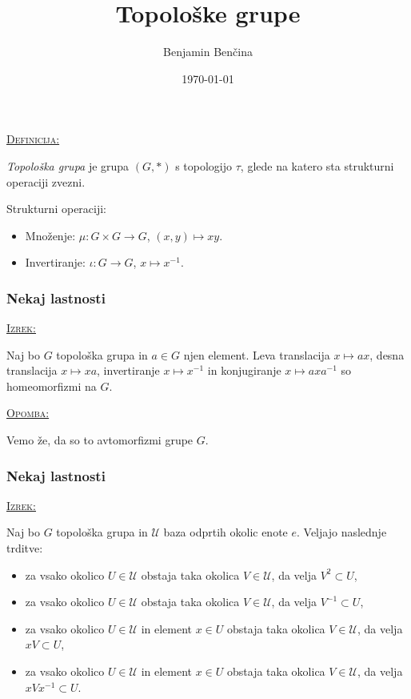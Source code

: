 \documentclass[a4paper, 12pt]{beamer}
\title{Topološke grupe}
\author{Benjamin Benčina}
\institute[FMF]{Fakulteta za matematiko in fiziko}
\date{\today}
\newenvironment{matematika}[1]{
\textcolor{bostonuniversityred}{\underline{\textsc{#1:}}}
}{
}
\begin{document}
	
\titlepage
	
\begin{frame}
\begin{matematika}{Definicija}
	\emph{Topološka grupa} je grupa $(G, *)$ s topologijo $\tau$, glede na katero sta strukturni operaciji zvezni.
\end{matematika}
\newline
\newline
Strukturni operaciji:
\begin{itemize}[label=]
	\item Množenje: $\mu : G \times G \to G$, $(x, y) \mapsto xy$.
	\item Invertiranje: $\iota : G \to G$, $x \mapsto x^{-1}$.
\end{itemize}

\end{frame}

\begin{frame}
\frametitle{Nekaj lastnosti}
\begin{matematika}{Izrek}
Naj bo $G$ topološka grupa in $a \in G$ njen element. Leva translacija $x \mapsto ax$, desna translacija $x \mapsto xa$, invertiranje $x \mapsto x^{-1}$ in konjugiranje $x \mapsto axa^{-1}$ so homeomorfizmi na $G$.
\end{matematika} \newline

\begin{matematika}{Opomba}
Vemo že, da so to avtomorfizmi grupe $G$.
\end{matematika}
\end{frame}

\begin{frame}
\frametitle{Nekaj lastnosti}
\begin{matematika}{Izrek}
Naj bo $G$ topološka grupa in $\mathcal{U}$ baza odprtih okolic enote $e$. Veljajo naslednje trditve:\pause
\begin{itemize}[label=]
	\item za vsako okolico $U \in \mathcal{U}$ obstaja taka okolica $V \in \mathcal{U}$, da velja $V^2 \subset U$,\pause
	\item za vsako okolico $U \in \mathcal{U}$ obstaja taka okolica $V \in \mathcal{U}$, da velja $V^{-1} \subset U$,\pause
	\item za vsako okolico $U \in \mathcal{U}$ in element $x \in U$ obstaja taka okolica $V \in \mathcal{U}$, da velja $xV \subset U$,\pause
	\item za vsako okolico $U \in \mathcal{U}$ in element $x \in U$ obstaja taka okolica $V \in \mathcal{U}$, da velja $xVx^{-1} \subset U$.
\end{itemize}
\end{matematika}
\end{frame}
\end{document}
